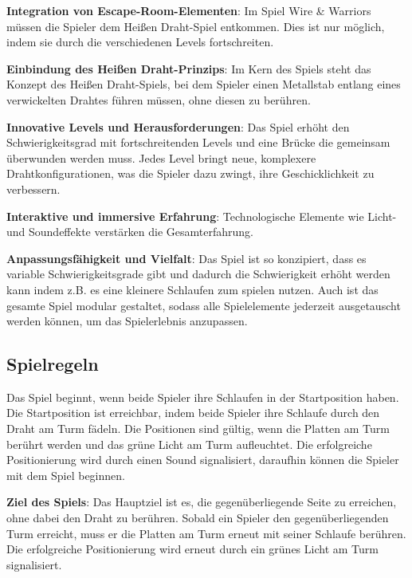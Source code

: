 \begin{compactitem}
 \item \textbf{Integration von Escape-Room-Elementen}: Im Spiel Wire \& Warriors müssen die Spieler dem Heißen Draht-Spiel entkommen. Dies ist nur möglich, indem sie durch die verschiedenen Levels fortschreiten. 
 \item \textbf{Einbindung des Heißen Draht-Prinzips}: Im Kern des Spiels steht das Konzept des Heißen Draht-Spiels, bei dem Spieler einen Metallstab entlang eines verwickelten Drahtes führen müssen, ohne diesen zu berühren.
 \item \textbf{Innovative Levels und Herausforderungen}: Das Spiel erhöht den Schwierigkeitsgrad mit fortschreitenden Levels und eine Brücke die gemeinsam überwunden werden muss. Jedes Level bringt neue, komplexere Drahtkonfigurationen, was die Spieler dazu zwingt, ihre Geschicklichkeit zu verbessern.
 \item \textbf{Interaktive und immersive Erfahrung}: Technologische Elemente wie Licht- und Soundeffekte verstärken die Gesamterfahrung.
 \item \textbf{Anpassungsfähigkeit und Vielfalt}: Das Spiel ist so konzipiert, dass es variable Schwierigkeitsgrade gibt und dadurch die Schwierigkeit erhöht werden kann indem z.B. es eine kleinere Schlaufen zum spielen nutzen. Auch ist das gesamte Spiel modular gestaltet, sodass alle Spielelemente jederzeit ausgetauscht werden können, um das Spielerlebnis anzupassen.
\end{compactitem}

\subsection{Spielregeln}

Das Spiel beginnt, wenn beide Spieler ihre Schlaufen in der Startposition haben. Die Startposition ist erreichbar, indem beide Spieler ihre Schlaufe durch den Draht am Turm fädeln. Die Positionen sind gültig, wenn die Platten am Turm berührt werden und das grüne Licht am Turm aufleuchtet. Die erfolgreiche Positionierung wird durch einen Sound signalisiert, daraufhin können die Spieler mit dem Spiel beginnen.

\textbf{Ziel des Spiels}: Das Hauptziel ist es, die gegenüberliegende Seite zu erreichen, ohne dabei den Draht zu berühren. Sobald ein Spieler den gegenüberliegenden Turm erreicht, muss er die Platten am Turm erneut mit seiner Schlaufe berühren. Die erfolgreiche Positionierung wird erneut durch ein grünes Licht am Turm signalisiert.

